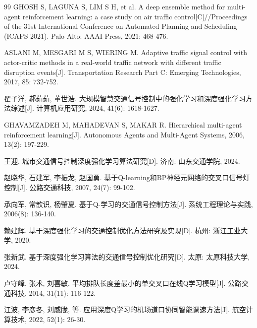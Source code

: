 \documentclass[12pt,a4paper,UTF8]{ctexart}
\begin{document}
\begin{thebibliography}{99}
 GHOSH S, LAGUNA S, LIM S H, et al. A deep ensemble method for multi-agent reinforcement learning: a case study on air traffic control[C]//Proceedings of the 31st International Conference on Automated Planning and Scheduling (ICAPS 2021). Palo Alto: AAAI Press, 2021: 468-476.

 ASLANI M, MESGARI M S, WIERING M. Adaptive traffic signal control with actor-critic methods in a real-world traffic network with different traffic disruption events[J]. Transportation Research Part C: Emerging Technologies, 2017, 85: 732-752.

 翟子洋, 郝茹茹, 董世浩. 大规模智慧交通信号控制中的强化学习和深度强化学习方法综述[J]. 计算机应用研究, 2024, 41(6): 1618-1627.

 GHAVAMZADEH M, MAHADEVAN S, MAKAR R. Hierarchical multi-agent reinforcement learning[J]. Autonomous Agents and Multi-Agent Systems, 2006, 13(2): 197-229.

 王迎. 城市交通信号控制深度强化学习算法研究[D]. 济南: 山东交通学院, 2024.

 赵晓华, 石建军, 李振龙, 赵国勇. 基于Q-learning和BP神经元网络的交叉口信号灯控制[J]. 公路交通科技, 2007, 24(7): 99-102.

 承向军, 常歆识, 杨肇夏. 基于Q-学习的交通信号控制方法[J]. 系统工程理论与实践, 2006(8): 136-140.

 赖建辉. 基于深度强化学习的交通控制优化方法研究及实现[D]. 杭州: 浙江工业大学, 2020.

 张新武. 基于深度强化学习算法的交通信号控制优化研究[D]. 太原: 太原科技大学, 2024.

 卢守峰, 张术, 刘喜敏. 平均排队长度差最小的单交叉口在线Q学习模型[J]. 公路交通科技, 2014, 31(11): 116-122.

 江波, 李彦冬, 刘威陇, 等. 应用深度Q学习的机场道口协同智能调速方法[J]. 航空计算技术, 2022, 52(1): 26-30.

\end{thebibliography}
\end{document}
